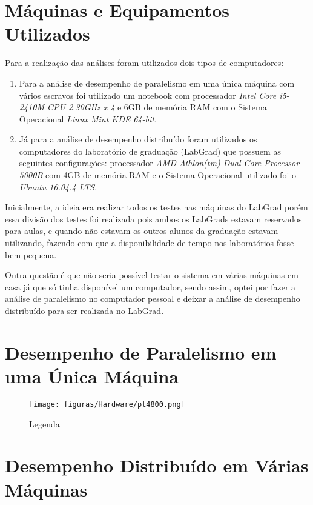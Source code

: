 \documentclass[
	12pt,				%
    oneside,			%
	a4paper,			%
	english,			%
	brazil,				%
	]{abntex2}
\begin{document}
\section{Máquinas e Equipamentos Utilizados}
Para a realização das análises foram utilizados dois tipos de computadores:

\begin{enumerate}

	\item Para a análise de desempenho de paralelismo em uma única máquina com vários escravos foi utilizado um notebook com processador \textit{Intel Core i5-2410M CPU 2.30GHz x 4} e 6GB de memória RAM com o Sistema Operacional \textit{Linux Mint KDE 64-bit}.

	\item Já para a análise de desempenho distribuído foram utilizados os computadores do laboratório de graduação (LabGrad) que possuem as seguintes configurações: processador \textit{AMD Athlon(tm) Dual Core Processor 5000B} com 4GB de memória RAM e o Sistema Operacional utilizado foi o \textit{Ubuntu 16.04.4 LTS}.

\end{enumerate}

Inicialmente, a ideia era realizar todos os testes nas máquinas do LabGrad porém essa divisão dos testes foi realizada pois ambos os LabGrads estavam reservados para aulas, e quando não estavam os outros alunos da graduação estavam utilizando, fazendo com que a disponibilidade de tempo nos laboratórios fosse bem pequena. 

Outra questão é que não seria possível testar o sistema em várias máquinas em casa já que só tinha disponível um computador, sendo assim, optei por fazer a análise de paralelismo no computador pessoal e deixar a análise de desempenho distribuído para ser realizada no LabGrad.

\section{Desempenho de Paralelismo em uma Única Máquina}

\begin{figure}[!htb]
\centering
\caption{Legenda}
\texttt{[image: figuras/Hardware/pt4800.png]}
\label{fig:pt4800}
\end{figure}


\section{Desempenho Distribuído em Várias Máquinas}
\end{document}
